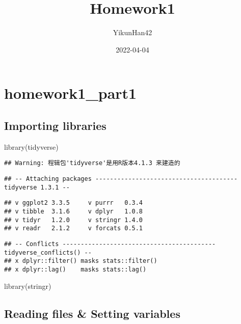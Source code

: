 \documentclass[
]{article}
\title{Homework1}
\author{YikunHan42}
\date{2022-04-04}
\newenvironment{Shaded}{\begin{snugshade}}{\end{snugshade}}
\newcommand{\FunctionTok}[1]{\textcolor[rgb]{0.00,0.00,0.00}{#1}}
\newcommand{\NormalTok}[1]{#1}
\begin{document}
\maketitle

\hypertarget{homework1_part1}{%
\section{homework1\_part1}\label{homework1_part1}}

\hypertarget{importing-libraries}{%
\subsection{Importing libraries}\label{importing-libraries}}

\begin{Shaded}
\begin{Highlighting}[]
\FunctionTok{library}\NormalTok{(tidyverse)}
\end{Highlighting}
\end{Shaded}

\begin{verbatim}
## Warning: 程辑包'tidyverse'是用R版本4.1.3 来建造的
\end{verbatim}

\begin{verbatim}
## -- Attaching packages --------------------------------------- tidyverse 1.3.1 --
\end{verbatim}

\begin{verbatim}
## v ggplot2 3.3.5     v purrr   0.3.4
## v tibble  3.1.6     v dplyr   1.0.8
## v tidyr   1.2.0     v stringr 1.4.0
## v readr   2.1.2     v forcats 0.5.1
\end{verbatim}

\begin{verbatim}
## -- Conflicts ------------------------------------------ tidyverse_conflicts() --
## x dplyr::filter() masks stats::filter()
## x dplyr::lag()    masks stats::lag()
\end{verbatim}

\begin{Shaded}
\begin{Highlighting}[]
\FunctionTok{library}\NormalTok{(stringr)}
\end{Highlighting}
\end{Shaded}

\hypertarget{reading-files-setting-variables}{%
\subsection{Reading files \& Setting
variables}\label{reading-files-setting-variables}}
\end{document}
